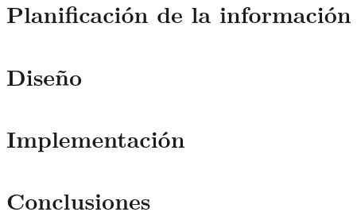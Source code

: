 \documentclass{article}
\begin{document}
			\paragraph{}
			



	\section{Planificación de la información}



	\section{Diseño}



	\section{Implementación}


	
	\section{Conclusiones}
\end{document}
